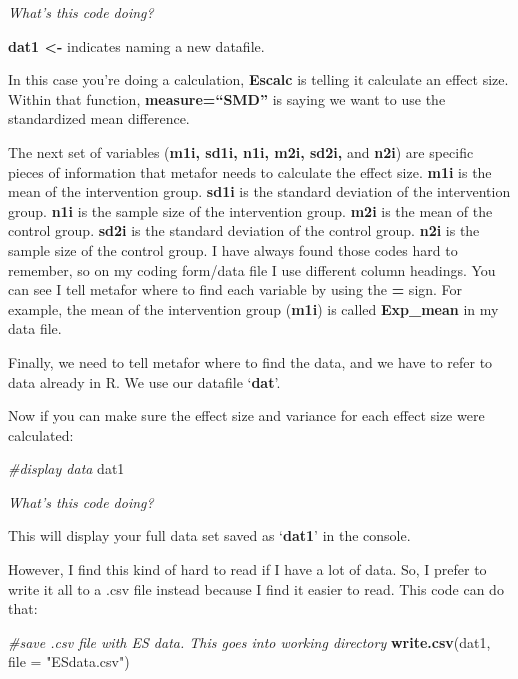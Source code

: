 \documentclass[
]{book}
\newenvironment{Shaded}{\begin{snugshade}}{\end{snugshade}}
\newcommand{\AttributeTok}[1]{\textcolor[rgb]{0.13,0.29,0.53}{#1}}
\newcommand{\CommentTok}[1]{\textcolor[rgb]{0.56,0.35,0.01}{\textit{#1}}}
\newcommand{\FunctionTok}[1]{\textcolor[rgb]{0.13,0.29,0.53}{\textbf{#1}}}
\newcommand{\NormalTok}[1]{#1}
\newcommand{\StringTok}[1]{\textcolor[rgb]{0.31,0.60,0.02}{#1}}
\begin{document}
\emph{What's this code doing?}

\textbf{dat1 \textless-} indicates naming a new datafile.

In this case you're doing a calculation, \textbf{Escalc} is telling it calculate an effect size. Within that function, \textbf{measure=``SMD''} is saying we want to use the standardized mean difference.

The next set of variables (\textbf{m1i, sd1i, n1i, m2i, sd2i,} and \textbf{n2i}) are specific pieces of information that metafor needs to calculate the effect size. \textbf{m1i} is the mean of the intervention group. \textbf{sd1i} is the standard deviation of the intervention group. \textbf{n1i} is the sample size of the intervention group. \textbf{m2i} is the mean of the control group. \textbf{sd2i} is the standard deviation of the control group. \textbf{n2i} is the sample size of the control group. I have always found those codes hard to remember, so on my coding form/data file I use different column headings. You can see I tell metafor where to find each variable by using the \textbf{=} sign. For example, the mean of the intervention group (\textbf{m1i}) is called \textbf{Exp\_mean} in my data file.

Finally, we need to tell metafor where to find the data, and we have to refer to data already in R. We use our datafile `\textbf{dat}'.

Now if you can make sure the effect size and variance for each effect size were calculated:

\begin{Shaded}
\begin{Highlighting}[]
\CommentTok{\#display data}
\NormalTok{dat1}
\end{Highlighting}
\end{Shaded}

\emph{What's this code doing?}

This will display your full data set saved as `\textbf{dat1}' in the console.

However, I find this kind of hard to read if I have a lot of data. So, I prefer to write it all to a .csv file instead because I find it easier to read. This code can do that:

\begin{Shaded}
\begin{Highlighting}[]
\CommentTok{\#save .csv file with ES data. This goes into working directory}
\FunctionTok{write.csv}\NormalTok{(dat1, }\AttributeTok{file =} \StringTok{"ESdata.csv"}\NormalTok{)}
\end{Highlighting}
\end{Shaded}
\end{document}
